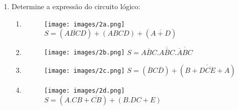 \documentclass{article}[12pt]
\begin{document}
\begin{enumerate}
    \item Determine a expressão do circuito lógico:
    \begin{enumerate}
        \item
            \begin{figure}[h!bt]
                \begin{center}
                    \texttt{[image: images/2a.png]}
                    \hspace{1cm}
                    $S = (A\overline{BC}D) + (ABCD) + (\overline{A+D})$
                \end{center}
            \end{figure}
        \item
            \begin{figure}[h!bt]
                \begin{center}
                    \texttt{[image: images/2b.png]}
                    \hspace{1cm}
                    $S = \overline{ABC}.\overline{A\overline{B}C}.\overline{\overline{A}BC}$
                \end{center}
            \end{figure}
        \item
            \begin{figure}[h!bt]
                \begin{center}
                    \texttt{[image: images/2c.png]}
                    \hspace{1cm}
                    $S = (\overline{B}C\overline{D})+(\overline{B+D\overline{CE}+A})$
                \end{center}
            \end{figure}
        \item
            \begin{figure}[h!bt]
                \begin{center}
                    \texttt{[image: images/2d.png]}
                    \hspace{1cm}
                    $S = (A.CB+\overline{CB})+(B.DC+E)$
                \end{center}
            \end{figure}
    \end{enumerate}


\end{enumerate}
\end{document}

